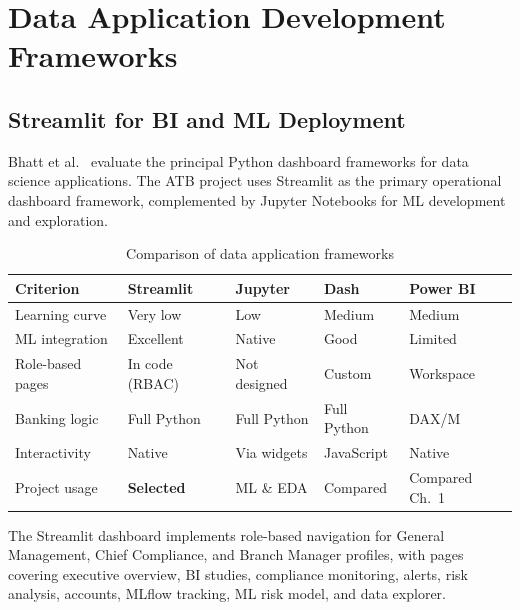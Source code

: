 \section{Data Application Development Frameworks}

\subsection{Streamlit for BI and ML Deployment}

Bhatt et al.\ \cite{bhatt2021} evaluate the principal Python dashboard frameworks for
data science applications. The ATB project uses Streamlit as the primary operational
dashboard framework, complemented by Jupyter Notebooks for ML development and exploration.

\begin{table}[H]
\centering
\footnotesize
\caption{Comparison of data application frameworks}
\label{tab:atb_reporting_frameworks}
\begin{tabular}{|p{2.8cm}|p{2.4cm}|p{2.4cm}|p{2.4cm}|p{2.4cm}|}
\hline
\rowcolor{blue!15}
\textbf{Criterion} & \textbf{Streamlit} & \textbf{Jupyter} & \textbf{Dash} &
\textbf{Power BI} \\
\hline
Learning curve & Very low & Low & Medium & Medium \\
\hline
ML integration & Excellent & Native & Good & Limited \\
\hline
Role-based pages & In code (RBAC) & Not designed & Custom & Workspace \\
\hline
Banking logic & Full Python & Full Python & Full Python & DAX/M \\
\hline
Interactivity & Native & Via widgets & JavaScript & Native \\
\hline
Project usage & \textbf{Selected} & ML \& EDA & Compared & Compared Ch.~1 \\
\hline
\end{tabular}
\end{table}

The Streamlit dashboard implements role-based navigation for General Management, Chief
Compliance, and Branch Manager profiles, with pages covering executive overview, BI
studies, compliance monitoring, alerts, risk analysis, accounts, MLflow tracking, ML
risk model, and data explorer.


